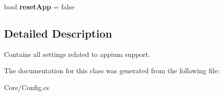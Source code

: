 \begin{DoxyCompactItemize}
\item 
\hypertarget{class_proto_test_1_1_golem_1_1_core_1_1_config_settings_1_1_appium_settings_ab1dbd06d4e457e0fd559d0fc250564c6}{bool {\bfseries reset\-App} = false}\label{class_proto_test_1_1_golem_1_1_core_1_1_config_settings_1_1_appium_settings_ab1dbd06d4e457e0fd559d0fc250564c6}

\end{DoxyCompactItemize}


\subsection{Detailed Description}
Contains all settings related to appium support. 



The documentation for this class was generated from the following file\-:\begin{DoxyCompactItemize}
\item 
Core/Config.\-cs\end{DoxyCompactItemize}
